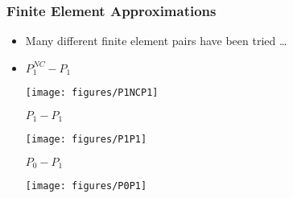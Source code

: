 \begin{frame}%
  \frametitle{Finite Element Approximations}
  \begin{itemize}
    \item{Many different finite element pairs have been tried \ldots}
    \item{
      {
	$P_1^{NC}-P_1$
	\begin{center}
	  \texttt{[image: figures/P1NCP1]}
	\end{center}
      }
      {
	$P_1-P_1$
	\begin{center}
	  \texttt{[image: figures/P1P1]}
	\end{center}
      }
      {
	$P_0-P_1$
	\begin{center}
	  \texttt{[image: figures/P0P1]}
	\end{center}
      }
    }
  \end{itemize}
\end{frame}


